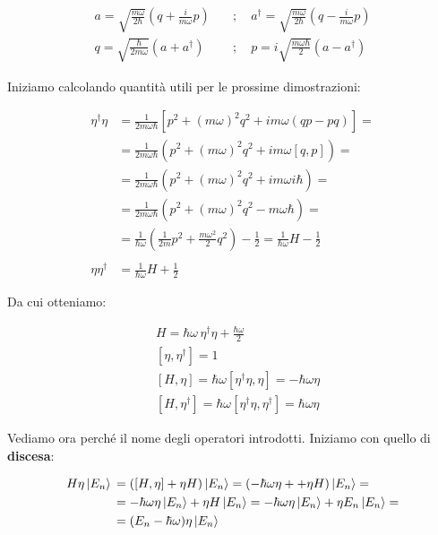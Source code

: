 \begin{align}
a= \sqrt{\frac{m\omega}{2\hbar}}(q+ \frac{i}{m\omega}p)\quad &; \quad a^\dagger = \sqrt{\frac{m\omega}{2\hbar}}(q- \frac{i}{m\omega}p) \\
q= \sqrt{\frac{\hbar}{2m\omega}}(a + a^\dagger) \quad &; \quad p= i\sqrt{\frac{m\omega \hbar}{2}}(a - a^\dagger)
\end{align}

Iniziamo calcolando quantità utili per le prossime dimostrazioni:

\begin{align}
\eta^\dagger \eta {}&= \frac{1}{2m\omega\hbar}[p^2 + (m\omega)^2 q^2 + im\omega(qp - pq)]= \nonumber \\
& = \frac{1}{2m\omega\hbar}(p^2 + (m\omega)^2 q^2 + im\omega[q,p])= \nonumber \\
&= \frac{1}{2m\omega\hbar}(p^2 + (m\omega)^2 q^2 + im\omega i\hbar)= \nonumber \\
&= \frac{1}{2m\omega\hbar}(p^2 + (m\omega)^2 q^2 - m\omega\hbar) = \nonumber \\
&= \frac{1}{\hbar\omega}\left(\frac{1}{2m}p^2 + \frac{m\omega^2}{2} q^2\right) - \frac{1}{2}= \frac{1}{\hbar\omega}H -\frac{1}{2} \\
\nonumber \\
\eta \eta^\dagger &= \frac{1}{\hbar\omega}H +\frac{1}{2}
\end{align}

\newpage 
Da cui otteniamo: 

\begin{align}
{}&H =\hbar\omega \, \eta^\dagger \eta + \frac{\hbar\omega}{2} \\
&[\eta,\eta^\dagger]=1 \\
&[H,\eta]= \hbar\omega [\eta^\dagger \eta, \eta]= -\hbar\omega \eta \\
&[H,\eta^\dagger]= \hbar\omega [\eta^\dagger \eta, \eta^\dagger]= \hbar\omega \eta
\end{align}

Vediamo ora perché il nome degli operatori introdotti. Iniziamo con quello di \textbf{discesa}:

\begin{align}
H\eta\ket{E_n} {}&= ([H,\eta] +\eta H)\ket{E_n}= (-\hbar\omega \eta + +\eta H)\ket{E_n}= \nonumber \\
&= -\hbar\omega \eta \ket{E_n} + \eta H \ket{E_n} = -\hbar\omega \eta \ket{E_n} + \eta E_n \ket{E_n}=\nonumber \\
&=  (E_n-\hbar \omega) \eta \ket{E_n}
\end{align}

